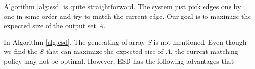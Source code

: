 \documentclass[letterpaper]{article}
\begin{document}
Algorithm \ref{alg:esd} is quite straightforward. The system just pick edges one by one in some order and try to match the current edge. Our goal is to maximize the expected size of the output set $A$.

In Algorithm \ref{alg:esd}, The generating of array $S$ is not mentioned.
Even though we find the $S$ that can maximize the expected size of $A$, the current matching policy may not be optimal.
However, ESD has the following advantages that 



\newpage


\end{document}
